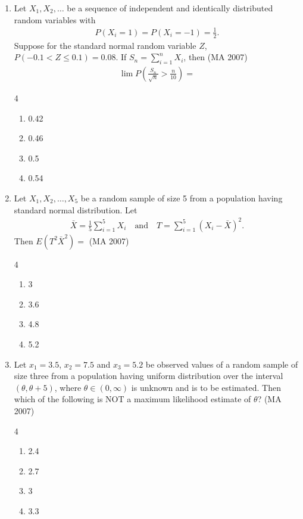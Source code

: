 \begin{enumerate}[label=\thesubsection.\arabic*,ref=\thesubsection.\theenumi]
\item Let $X_1, X_2, \ldots$ be a sequence of independent and identically distributed random variables with    
\begin{align*}
P(X_i = 1) = P(X_i = -1) = \frac{1}{2}.
\end{align*}
Suppose for the standard normal random variable $Z$, $P(-0.1 < Z \leq 0.1) = 0.08$. If $S_n = \sum_{i=1}^{n} X_i$, then
    \hfill (MA 2007)
\begin{align*}
\lim P\left(\frac{S_n}{\sqrt{n}} > \frac{n}{10}\right) =
\end{align*}
\begin{multicols}{4}
\begin{enumerate}
    \item 0.42
    \item 0.46
    \item 0.5
    \item 0.54  
\end{enumerate}
\end{multicols}
\item  Let $X_1, X_2, \ldots, X_5$ be a random sample of size 5 from a population having standard normal distribution. Let 
\begin{align*}
\bar{X} = \frac{1}{5} \sum_{i=1}^{5} X_i \quad \text{and} \quad T = \sum_{i=1}^{5} (X_i - \bar{X})^2.
\end{align*}
Then $E(T^2 \bar{X}^2) =$ \hfill (MA 2007)
\begin{multicols}{4}
\begin{enumerate}
    \item 3
    \item 3.6
    \item 4.8
    \item 5.2
\end{enumerate}
\end{multicols}
%
\item Let $x_1 = 3.5$, $x_2 = 7.5$ and $x_3 = 5.2$ be observed values of a random sample of size three from a population having uniform distribution over the interval $(\theta, \theta + 5)$, where $\theta \in (0, \infty)$ is unknown and is to be estimated. Then which of the following is NOT a maximum likelihood estimate of $\theta$?
\hfill (MA 2007)
\begin{multicols}{4}
\begin{enumerate}
    \item 2.4
    \item 2.7
    \item 3
    \item 3.3
\end{enumerate}
\end{multicols}


\end{enumerate}
